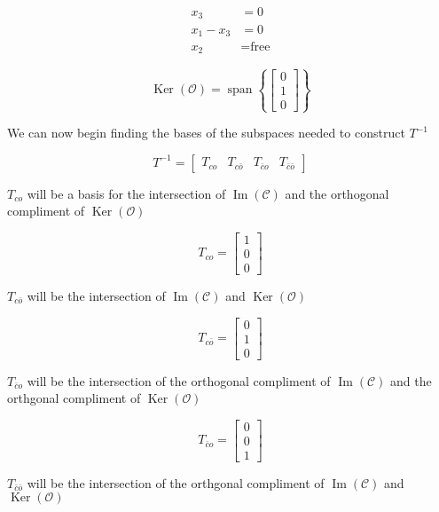 \documentclass{article}
\begin{document}
\begin{enumerate}[label=\alph*)]
\begin{align*}
    x_3 &= 0 \\
    x_1 - x_3 &= 0 \\
    x_2 & = \text{free}
\end{align*}

\[
\operatorname{Ker}(\mathcal{O}) = \operatorname{span}\left\{ 
    \begin{bmatrix}
        0 \\
        1 \\
        0
    \end{bmatrix}
\right\}
\]

We can now begin finding the bases of the subspaces needed to construct $T^{-1}$

\[
T^{-1} = 
\begin{bmatrix}
    T_{c o} & T_{c \bar o} & T_{\bar c o} & T_{\bar c \bar o}
\end{bmatrix}
\]



$T_{co}$ will be a basis for the intersection of $\operatorname{Im}(\mathcal{C})$ and the orthogonal compliment of $\operatorname{Ker}(\mathcal{O})$

\[
T_{co} = 
\begin{bmatrix}
    1 \\
    0 \\
    0
\end{bmatrix}
\]

$T_{c \bar o}$ will be the intersection of $\operatorname{Im}(\mathcal{C})$ and $\operatorname{Ker}(\mathcal{O})$

\[
T_{c \bar o} =
\begin{bmatrix}
    0 \\
    1 \\
    0
\end{bmatrix}
\]

$T_{\bar c o}$ will be the intersection of the orthogonal compliment of $\operatorname{Im}(\mathcal{C})$ and the orthgonal compliment of $\operatorname{Ker}(\mathcal{O})$

\[
T_{\bar c o} =
\begin{bmatrix}
    0 \\
    0 \\
    1
\end{bmatrix}
\]

$T_{\bar c \bar o}$ will be the intersection of the orthgonal compliment of  $\operatorname{Im}(\mathcal{C})$ and $\operatorname{Ker}(\mathcal{O})$


\end{enumerate}
\end{document}
